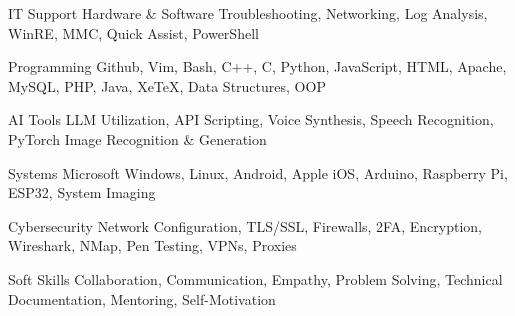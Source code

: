 
\begin{cvskills}
  \cvskill
    {IT Support} %
	{Hardware \& Software Troubleshooting, Networking, Log Analysis, WinRE, MMC, Quick Assist, PowerShell} %

  \cvskill
    {Programming} %
    {Github, Vim, Bash, C++, C, Python, JavaScript, HTML, Apache, MySQL, PHP, Java, XeTeX, Data Structures, OOP} %

  \cvskill
    {AI Tools} %
	{LLM Utilization, API Scripting, Voice Synthesis, Speech Recognition, PyTorch Image Recognition \& Generation} %

  \cvskill
    {Systems} %
	{Microsoft Windows, Linux, Android, Apple iOS, Arduino, Raspberry Pi, ESP32, System Imaging} %

  \cvskill
    {Cybersecurity} %
	{Network Configuration, TLS/SSL, Firewalls, 2FA, Encryption, Wireshark, NMap, Pen Testing, VPNs, Proxies} %

  \cvskill
    {Soft Skills} %
	{Collaboration, Communication, Empathy, Problem Solving, Technical Documentation, Mentoring, Self-Motivation} %

\end{cvskills}
